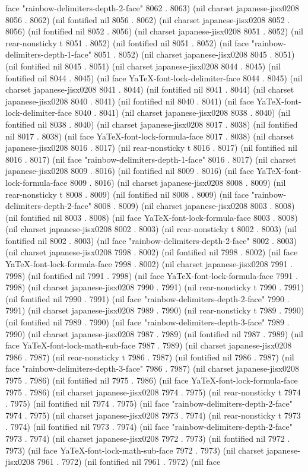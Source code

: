 face "rainbow-delimiters-depth-2-face" 8062 . 8063) (nil charset japanese-jisx0208 8056 . 8062) (nil fontified nil 8056 . 8062) (nil charset japanese-jisx0208 8052 . 8056) (nil fontified nil 8052 . 8056) (nil charset japanese-jisx0208 8051 . 8052) (nil rear-nonsticky t 8051 . 8052) (nil fontified nil 8051 . 8052) (nil face "rainbow-delimiters-depth-1-face" 8051 . 8052) (nil charset japanese-jisx0208 8045 . 8051) (nil fontified nil 8045 . 8051) (nil charset japanese-jisx0208 8044 . 8045) (nil fontified nil 8044 . 8045) (nil face YaTeX-font-lock-delimiter-face 8044 . 8045) (nil charset japanese-jisx0208 8041 . 8044) (nil fontified nil 8041 . 8044) (nil charset japanese-jisx0208 8040 . 8041) (nil fontified nil 8040 . 8041) (nil face YaTeX-font-lock-delimiter-face 8040 . 8041) (nil charset japanese-jisx0208 8038 . 8040) (nil fontified nil 8038 . 8040) (nil charset japanese-jisx0208 8017 . 8038) (nil fontified nil 8017 . 8038) (nil face YaTeX-font-lock-formula-face 8017 . 8038) (nil charset japanese-jisx0208 8016 . 8017) (nil rear-nonsticky t 8016 . 8017) (nil fontified nil 8016 . 8017) (nil face "rainbow-delimiters-depth-1-face" 8016 . 8017) (nil charset japanese-jisx0208 8009 . 8016) (nil fontified nil 8009 . 8016) (nil face YaTeX-font-lock-formula-face 8009 . 8016) (nil charset japanese-jisx0208 8008 . 8009) (nil rear-nonsticky t 8008 . 8009) (nil fontified nil 8008 . 8009) (nil face "rainbow-delimiters-depth-2-face" 8008 . 8009) (nil charset japanese-jisx0208 8003 . 8008) (nil fontified nil 8003 . 8008) (nil face YaTeX-font-lock-formula-face 8003 . 8008) (nil charset japanese-jisx0208 8002 . 8003) (nil rear-nonsticky t 8002 . 8003) (nil fontified nil 8002 . 8003) (nil face "rainbow-delimiters-depth-2-face" 8002 . 8003) (nil charset japanese-jisx0208 7998 . 8002) (nil fontified nil 7998 . 8002) (nil face YaTeX-font-lock-formula-face 7998 . 8002) (nil charset japanese-jisx0208 7991 . 7998) (nil fontified nil 7991 . 7998) (nil face YaTeX-font-lock-formula-face 7991 . 7998) (nil charset japanese-jisx0208 7990 . 7991) (nil rear-nonsticky t 7990 . 7991) (nil fontified nil 7990 . 7991) (nil face "rainbow-delimiters-depth-2-face" 7990 . 7991) (nil charset japanese-jisx0208 7989 . 7990) (nil rear-nonsticky t 7989 . 7990) (nil fontified nil 7989 . 7990) (nil face "rainbow-delimiters-depth-3-face" 7989 . 7990) (nil charset japanese-jisx0208 7987 . 7989) (nil fontified nil 7987 . 7989) (nil face YaTeX-font-lock-math-sub-face 7987 . 7989) (nil charset japanese-jisx0208 7986 . 7987) (nil rear-nonsticky t 7986 . 7987) (nil fontified nil 7986 . 7987) (nil face "rainbow-delimiters-depth-3-face" 7986 . 7987) (nil charset japanese-jisx0208 7975 . 7986) (nil fontified nil 7975 . 7986) (nil face YaTeX-font-lock-formula-face 7975 . 7986) (nil charset japanese-jisx0208 7974 . 7975) (nil rear-nonsticky t 7974 . 7975) (nil fontified nil 7974 . 7975) (nil face "rainbow-delimiters-depth-2-face" 7974 . 7975) (nil charset japanese-jisx0208 7973 . 7974) (nil rear-nonsticky t 7973 . 7974) (nil fontified nil 7973 . 7974) (nil face "rainbow-delimiters-depth-2-face" 7973 . 7974) (nil charset japanese-jisx0208 7972 . 7973) (nil fontified nil 7972 . 7973) (nil face YaTeX-font-lock-math-sub-face 7972 . 7973) (nil charset japanese-jisx0208 7961 . 7972) (nil fontified nil 7961 . 7972) (nil face 